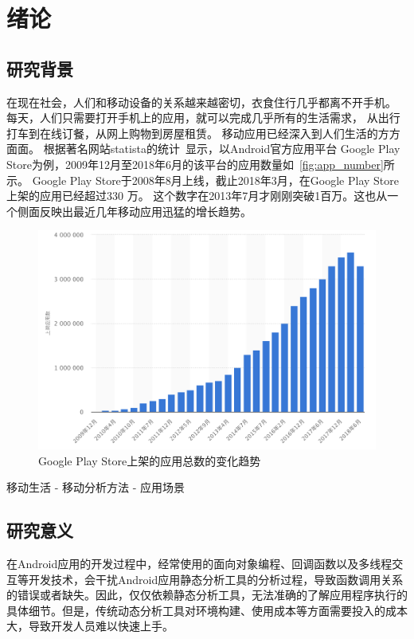 \chapter {绪论}
\label{ch1}

\section{研究背景}

在现在社会，人们和移动设备的关系越来越密切，衣食住行几乎都离不开手机。
每天，人们只需要打开手机上的应用，就可以完成几乎所有的生活需求，
从出行打车到在线订餐，从网上购物到房屋租赁。
移动应用已经深入到人们生活的方方面面。
根据著名网站statista的统计~\cite{GoogleP55:online}显示，以Android官方应用平台 Google Play Store为例，2009年12月至2018年6月的该平台的应用数量如~\autoref{fig:app_number}所示。
Google Play Store于2008年8月上线，截止2018年3月，在Google Play Store 上架的应用已经超过330 万。
这个数字在2013年7月才刚刚突破1百万。这也从一个侧面反映出最近几年移动应用迅猛的增长趋势。

 \begin{figure}[hb]
	\centering
	\includegraphics[width=\textwidth]{./Figures/app-numbers.png}

	\caption{Google Play Store上架的应用总数的变化趋势}
	\label{fig:app_number}
\end{figure}


移动生活 - 移动分析方法 - 应用场景

\section{研究意义}

在Android应用的开发过程中，经常使用的面向对象编程、回调函数以及多线程交互等开发技术，会干扰Android应用静态分析工具的分析过程，导致函数调用关系的错误或者缺失。因此，仅仅依赖静态分析工具，无法准确的了解应用程序执行的具体细节。但是，传统动态分析工具对环境构建、使用成本等方面需要投入的成本大，导致开发人员难以快速上手。

